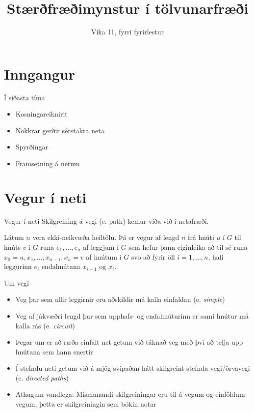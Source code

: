 \documentclass[handout]{beamer}
\title{Stærðfræðimynstur í tölvunarfræði}
\subtitle{Vika 11, fyrri fyrirlestur}
\begin{document}
\begin{frame}
\titlepage
\end{frame}


\section{Inngangur}

\begin{frame}{Í síðasta tíma}
\begin{itemize}
 \item Kosningareiknirit
 \item Nokkrar gerðir sérstakra neta
 \item Spyrðingar
 \item Framsetning á netum
\end{itemize}
\end{frame}

\section{Vegur í neti}

\begin{frame}{Vegur í neti}
Skilgreining á vegi (e.  path) kemur víða við í netafræði.

\begin{tcolorbox}[title=Vegur]
Látum $n$ vera ekki-neikvæða heiltölu. Þá er vegur af lengd $n$ frá hnúti $u$ í $G$ til hnúts $v$ í $G$ runa $e_1, \ldots, e_n$ af leggjum í $G$ sem hefur þann eiginleika að til sé runa $x_0 = u, x_1, \ldots, x_{n-1}, x_n = v$ af hnútum í $G$ svo að fyrir öll $i = 1, \ldots, n$, hafi leggurinn $e_i$ endahnútana $x_{i-1}$ og $x_i$.
\end{tcolorbox}
\end{frame}

\begin{frame}{Um vegi}
\begin{itemize}
 \item Veg þar sem allir leggirnir eru aðskildir má kalla einfaldan (e. \emph{simple})
 \item Veg af jákvæðri lengd þar sem upphafs- og endahnúturinn er sami hnútur má kalla rás (e. \emph{circuit})
 \item Þegar um er að ræða einfalt net getum við táknað veg með því að telja upp hnútana sem hann snertir
 \item Í stefndu neti getum við á mjög svipaðan hátt skilgreint stefnda vegi/örvavegi (e. \emph{directed paths})
 \item Athugum vandlega: Mismunandi skilgreiningar eru til á vegum og einföldum vegum, þetta er skilgreiningin sem bókin notar
\end{itemize}
\end{frame}
\end{document}
